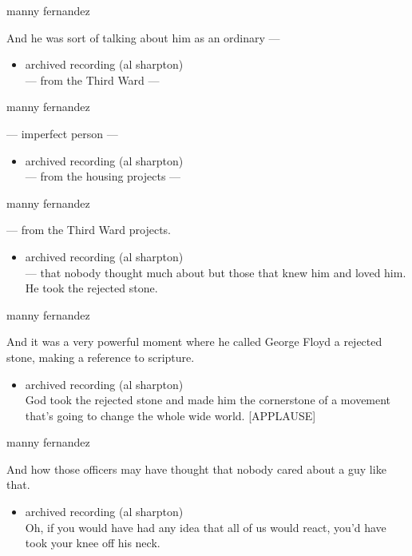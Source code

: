 manny fernandez

And he was sort of talking about him as an ordinary ---

\begin{itemize}
\tightlist
\item
  archived recording (al sharpton)\\
  --- from the Third Ward ---
\end{itemize}

manny fernandez

--- imperfect person ---

\begin{itemize}
\tightlist
\item
  archived recording (al sharpton)\\
  --- from the housing projects ---
\end{itemize}

manny fernandez

--- from the Third Ward projects.

\begin{itemize}
\tightlist
\item
  archived recording (al sharpton)\\
  --- that nobody thought much about but those that knew him and loved
  him. He took the rejected stone.
\end{itemize}

manny fernandez

And it was a very powerful moment where he called George Floyd a
rejected stone, making a reference to scripture.

\begin{itemize}
\tightlist
\item
  archived recording (al sharpton)\\
  God took the rejected stone and made him the cornerstone of a movement
  that's going to change the whole wide world. {[}APPLAUSE{]}
\end{itemize}

manny fernandez

And how those officers may have thought that nobody cared about a guy
like that.

\begin{itemize}
\tightlist
\item
  archived recording (al sharpton)\\
  Oh, if you would have had any idea that all of us would react, you'd
  have took your knee off his neck.
\end{itemize}

